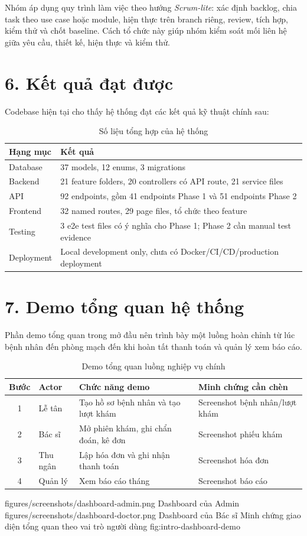 Nhóm áp dụng quy trình làm việc theo hướng \textit{Scrum-lite}: xác định backlog, chia task theo use case hoặc module, hiện thực trên branch riêng, review, tích hợp, kiểm thử và chốt baseline. Cách tổ chức này giúp nhóm kiểm soát mối liên hệ giữa yêu cầu, thiết kế, hiện thực và kiểm thử.

\section*{6. Kết quả đạt được}

Codebase hiện tại cho thấy hệ thống đạt các kết quả kỹ thuật chính sau:

\begin{table}[H]
\centering
\caption{Số liệu tổng hợp của hệ thống}
\begin{tabularx}{\textwidth}{|p{5cm}|X|}
\hline
\textbf{Hạng mục} & \textbf{Kết quả} \\
\hline
Database & 37 models, 12 enums, 3 migrations \\
\hline
Backend & 21 feature folders, 20 controllers có API route, 21 service files \\
\hline
API & 92 endpoints, gồm 41 endpoints Phase 1 và 51 endpoints Phase 2 \\
\hline
Frontend & 32 named routes, 29 page files, tổ chức theo feature \\
\hline
Testing & 3 e2e test files có ý nghĩa cho Phase 1; Phase 2 cần manual test evidence \\
\hline
Deployment & Local development only, chưa có Docker/CI/CD/production deployment \\
\hline
\end{tabularx}
\end{table}

\section*{7. Demo tổng quan hệ thống}

Phần demo tổng quan trong mở đầu nên trình bày một luồng hoàn chỉnh từ lúc bệnh nhân đến phòng mạch đến khi hoàn tất thanh toán và quản lý xem báo cáo.

\begin{table}[H]
\centering
\caption{Demo tổng quan luồng nghiệp vụ chính}
\begin{tabularx}{\textwidth}{|c|p{3.5cm}|X|p{3.5cm}|}
\hline
\textbf{Bước} & \textbf{Actor} & \textbf{Chức năng demo} & \textbf{Minh chứng cần chèn} \\
\hline
1 & Lễ tân & Tạo hồ sơ bệnh nhân và tạo lượt khám & Screenshot bệnh nhân/lượt khám \\
\hline
2 & Bác sĩ & Mở phiên khám, ghi chẩn đoán, kê đơn & Screenshot phiếu khám \\
\hline
3 & Thu ngân & Lập hóa đơn và ghi nhận thanh toán & Screenshot hóa đơn \\
\hline
4 & Quản lý & Xem báo cáo tháng & Screenshot báo cáo \\
\hline
\end{tabularx}
\end{table}

\TwoDemoFigures
{figures/screenshots/dashboard-admin.png}
{Dashboard của Admin}
{figures/screenshots/dashboard-doctor.png}
{Dashboard của Bác sĩ}
{Minh chứng giao diện tổng quan theo vai trò người dùng}
{fig:intro-dashboard-demo}
